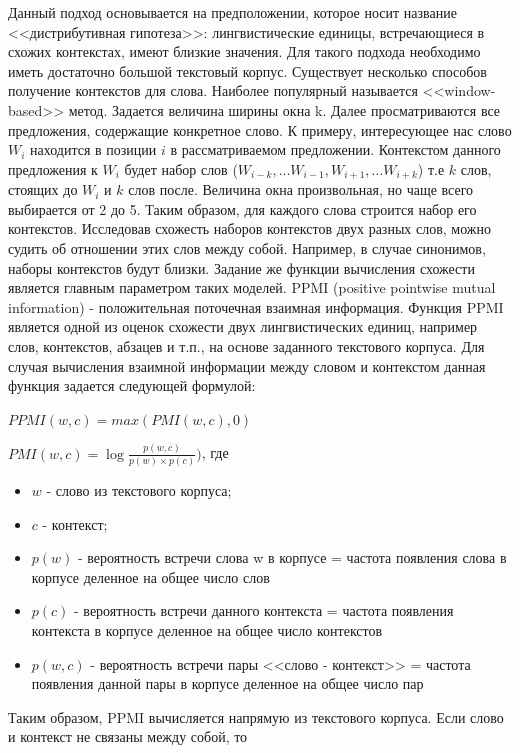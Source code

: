 Данный подход основывается на предположении, которое носит название
<<дистрибутивная гипотеза>>: лингвистические единицы, встречающиеся в схожих
контекстах, имеют близкие значения. Для такого подхода необходимо иметь достаточно
большой текстовый корпус.
Существует несколько способов получение контекстов для слова. Наиболее популярный
называется <<window-based>> метод. Задается величина ширины окна k. Далее
просматриваются все предложения, содержащие конкретное слово. К примеру,
интересующее нас слово $W_i$ находится в позиции $i$ в рассматриваемом предложении.
Контекстом данного предложения к $W_i$ будет набор слов ($W_{i-k}, \ldots W_{i-1}, W_{i+1}, \ldots W_{i+k}$) т.е $k$
слов, стоящих до $W_i$ и $k$ слов после. Величина окна произвольная, но чаще всего
выбирается от 2 до 5. Таким образом, для каждого слова строится набор его контекстов.
Исследовав схожесть наборов контекстов двух разных слов, можно судить об отношении
этих слов между собой. Например, в случае синонимов, наборы контекстов будут близки.
Задание же функции вычисления схожести является главным параметром таких моделей.
PPMI (positive pointwise mutual information) - положительная поточечная взаимная
информация. Функция PPMI является одной из оценок схожести двух лингвистических
единиц, например слов, контекстов, абзацев и т.п., на основе заданного текстового
корпуса. Для случая вычисления взаимной информации между словом и контекстом
данная функция задается следующей формулой:

$PPMI (w, c) = max(PMI (w, c), 0)$

$PMI (w, c) = \log \frac{p(w, c)}{p(w) \times p(c)})$, где


\begin{itemize}
\item $w$ - слово из текстового корпуса;
\item $c$ - контекст;
\item $p(w)$ - вероятность встречи слова w в корпусе = частота появления слова в
корпусе деленное на общее число слов
\item $p(c)$ - вероятность встречи данного контекста = частота появления контекста в
корпусе деленное на общее число контекстов
\item $p(w,c)$ - вероятность встречи пары <<слово - контекст>> = частота появления
данной пары в корпусе деленное на общее число пар
\end{itemize}

Таким образом, PPMI вычисляется напрямую из текстового корпуса. Если слово и
контекст не связаны между собой, то 

